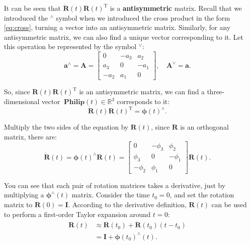       It can be seen that $\bm{\dot{R}} (t) \bm{R} {(t)^\mathrm{T}}$ is a \textbf{antisymmetric} matrix. Recall that we introduced the $^\wedge$ symbol when we introduced the cross product in the form \eqref{eq:cross}, turning a vector into an antisymmetric matrix. Similarly, for any antisymmetric matrix, we can also find a unique vector corresponding to it. Let this operation be represented by the symbol $^{\vee}$:
      \begin{equation}
{\bm{a}^ \wedge } = \bm{A} = \left[ {\begin{array}{*{20}{c}}
  0&{ - {a_3}}&{{a_2}}\\
  {{a_3}}&0&{ - {a_1}}\\
  { - {a_2}}&{{a_1}}&0
  \end{array}} \right], \quad
{ \bm{A}^ \vee } = \bm{a}.
\end{equation}

So, since $\bm{\dot{R}} (t) \bm{R} {(t)^\mathrm{T}}$ is an antisymmetric matrix, we can find a three-dimensional vector $\boldsymbol{\ Philip} (t) \in \mathbb{R}^3$ corresponds to it:
\[
  \bm{ \dot{R} } (t) \bm{R}(t)^\mathrm{T} = \boldsymbol{\phi} (t) ^ {\wedge}.
  \]

  Multiply the two sides of the equation by $\bm{R}(t)$, since $\bm{R}$ is an orthogonal matrix, there are:
  \begin{equation}
  \label{eq:dR}
  \bm{ \dot{R} } (t) = \boldsymbol{\phi} (t)^{\wedge} \bm{R}(t) =
  \left[ {\begin{array}{*{20}{c}}
    0&{ - {\phi _3}}&{{\phi _2}}\\
    {{\phi _3}}&0&{ - {\phi _1}}\\
    { - {\phi _2}}&{{\phi _1}}&0
    \end{array}} \right] \bm{R} (t).
    \end{equation}

    You can see that each pair of rotation matrices takes a derivative, just by multiplying a $\boldsymbol{\phi}^\wedge (t)$ matrix. Consider the time $t_0=0$, and set the rotation matrix to $\bm{R}(0) = \bm{I}$. According to the derivative definition, $\bm{R}(t)$ can be used to perform a first-order Taylor expansion around $t=0$:
    \begin{equation}
    \begin{aligned}
    \bm{R} \left( t \right) & \approx \bm{R} \left( t_0 \right) + \dot {\bm{R}} \left( {{t_0}} \right)\left ( {t - {t_0}} \right)\\
      &= \bm{I} + \boldsymbol{\phi} {\left( {{t_0}} \right)^ \wedge } \left( t \right).
      \end{aligned}
      \end{equation}


